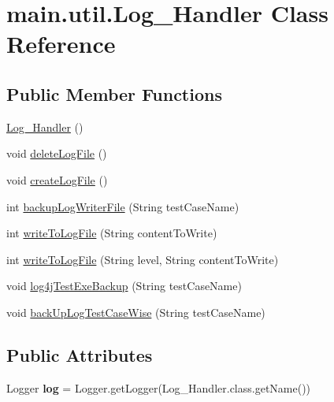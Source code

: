 \hypertarget{classmain_1_1util_1_1_log___handler}{}\section{main.\+util.\+Log\+\_\+\+Handler Class Reference}
\label{classmain_1_1util_1_1_log___handler}
\subsection*{Public Member Functions}
\begin{DoxyCompactItemize}
\item 
\mbox{\hyperlink{classmain_1_1util_1_1_log___handler_a3fc58be8e1937ce44367f9eeba0e390c}{Log\+\_\+\+Handler}} ()
\item 
void \mbox{\hyperlink{classmain_1_1util_1_1_log___handler_a5b492631563d77695ca14d0dd3af05ec}{delete\+Log\+File}} ()
\item 
void \mbox{\hyperlink{classmain_1_1util_1_1_log___handler_a263af7d36015999901a87f057550020f}{create\+Log\+File}} ()
\item 
int \mbox{\hyperlink{classmain_1_1util_1_1_log___handler_ae7256f977793bd0847c9775bd81743a8}{backup\+Log\+Writer\+File}} (String test\+Case\+Name)
\item 
int \mbox{\hyperlink{classmain_1_1util_1_1_log___handler_ab3b7d1c5620a36a1183aa1db40146f1f}{write\+To\+Log\+File}} (String content\+To\+Write)
\item 
int \mbox{\hyperlink{classmain_1_1util_1_1_log___handler_a77c07bc8ee96f3bef8948d2e4efa90f8}{write\+To\+Log\+File}} (String level, String content\+To\+Write)
\item 
void \mbox{\hyperlink{classmain_1_1util_1_1_log___handler_a08694f23b4736996c217c3ae80768fa1}{log4j\+Test\+Exe\+Backup}} (String test\+Case\+Name)
\item 
void \mbox{\hyperlink{classmain_1_1util_1_1_log___handler_af77a2fd0473dc8b7417c6beda7dd1d58}{back\+Up\+Log\+Test\+Case\+Wise}} (String test\+Case\+Name)
\end{DoxyCompactItemize}
\subsection*{Public Attributes}
\begin{DoxyCompactItemize}
\item 
\mbox{\label{classmain_1_1util_1_1_log___handler_a80457243c4af12e40d84b8dc7fef146d}} 
Logger {\bfseries log} = Logger.\+get\+Logger(Log\+\_\+\+Handler.\+class.\+get\+Name())
\end{DoxyCompactItemize}


